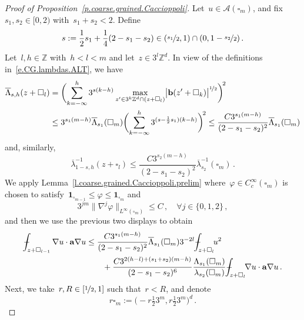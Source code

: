 \documentclass[11pt,twoside]{article} %
\let\oldsquare\square %
\renewcommand{\square}{\oldsquare}
\numberwithin{equation}{section}
\theoremstyle{definition}
\newcommand*{\Z}{\ensuremath{\mathbb{Z}}}
\newcommand*{\Zd}{\ensuremath{\mathbb{Z}^d}}
\renewcommand{\b}{\ensuremath{\mathbf{b}}}
\renewcommand{\a}{\mathbf{a}}
\newcommand{\cu}{\square}
\newcommand{\indc}{\boldsymbol{1}}
\def\Xint#1{\mathchoice
{\XXint\displaystyle\textstyle{#1}}%
{\XXint\textstyle\scriptstyle{#1}}%
{\XXint\scriptstyle\scriptscriptstyle{#1}}%
{\XXint\scriptscriptstyle\scriptscriptstyle{#1}}%
\!\int}
\def\XXint#1#2#3{{\setbox0=\hbox{$#1{#2#3}{\int}$}
\vcenter{\hbox{$#2#3$}}\kern-.5\wd0}}
\def\fint{\Xint-}
\begin{document}
\begin{proof}[Proof of Proposition~\ref{p.coarse.grained.Caccioppoli}] 
Let~$u \in \mathcal{A}(\cu_m)$, and fix~$s_1,s_2 \in [0,2)$ with~$s_1+s_2 < 2$. Define
\begin{equation*} 
s := \frac12 s_1 + \frac14 ( 2- s_1 - s_2) \in (\nicefrac{s_1}2,1) \cap (0,1-\nicefrac {s_2}2) \,.
\end{equation*}
Let~$l,h \in \Z$ with~$h<l <m$ and let~$z \in 3^l \Zd$. 
In view of the definitions in~\eqref{e.CG.lambdas.ALT}, we have  
\begin{align*} 
\overline{\Lambda}_{s,h}(z+\cu_l) 
&
=
\biggl(  
\sum_{k=-\infty}^{h} 
3^{s(k-h)} 
\max_{z'\in 3^k\Zd \cap (z+\cu_l)} 
\bigl| \b(z'+\cu_k) \bigr|^{\nicefrac12} \biggr)^{\!2}
\notag 
\\  & \leq
3^{s_1(m-h)}
\overline{\Lambda}_{s_1}(\cu_m) 
\biggl(  
\sum_{k=-\infty}^{h} 
3^{(s - \frac12 s_1) (k-h)} 
\biggr)^{\!2}
\leq \frac{C3^{s_1(m-h)}}{(2- s_1 - s_2)^{2}}
\overline{\Lambda}_{s_1}(\cu_m) 
\end{align*}
and, similarly,
\begin{equation*} 
\overline{\lambda}_{1-s,h}^{-1}(z+\cu_l)
\leq
 \frac{C3^{s_2(m-h)}}{(2 -s_1 -s_2)^{2}}
\overline{\lambda}_{s_2}^{-1}(\cu_m)
\,.
\end{equation*}
We apply Lemma~\ref{l.coarse.grained.Caccioppoli.prelim} where~$\varphi\in C^\infty_c (\cu_m)$ is chosen to satisfy~$\indc_{\cu_{m-1}} \leq \varphi \leq \indc_{\cu_m}$ and 
\begin{equation}
\label{e.cutoff.function}
3^{jm} \|\nabla^j \varphi\|_{L^\infty(\cu_m)} \leq C\,, \quad \forall j \in \{0,1,2\}\,,
\end{equation}
and then we use the previous two displays to obtain
\begin{align}
\label{e.coarse.grain.your.Caccioppoli.withextraterm.again}
\fint_{z+\cu_{l-1}} 
\nabla u \cdot \a\nabla u
& 
\leq 
\frac{C3^{s_1(m-h)}}{(2 -s_1-s_2)^{2}}
\overline{\Lambda}_{s_1}(\cu_m)
3^{-2l}\fint_{z+\cu_l} \!\! u^2 
\notag \\ & \qquad 
+\frac{C3^{2(h-l) + (s_1+s_2)(m-h)}}{(2- s_1 - s_2)^{6}}
\frac{\Lambda_{s_1}(\cu_m)}{\lambda_{s_2}(\cu_m)}
\fint_{z+\cu_l} \!\!
\nabla u \cdot \a\nabla u 
\,.
\end{align}
Next, we take~$r ,R \in [\nicefrac12,1]$ such that~$r<R$, and denote 
\begin{equation*} 
r \cu_m := \bigl( - r \tfrac{1}{2} 3^{m}, r \tfrac{1}{2} 3^{m} \bigr)^d\,.
\end{equation*} 

\end{proof}
\end{document}
